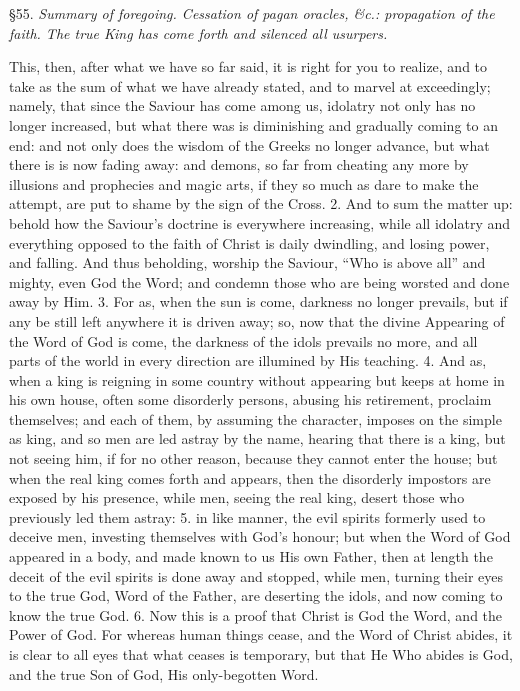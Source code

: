 
§55. \emph{Summary of foregoing. Cessation of pagan oracles, \&c.: propagation of the faith. The true King has come forth and silenced all usurpers.}

This, then, after what we have so far said, it is right for you to realize, and to take as the sum of what we have already stated, and to marvel at exceedingly; namely, that since the Saviour has come among us, idolatry not only has no longer increased, but what there was is diminishing and gradually coming to an end: and not only does the wisdom of the Greeks no longer advance, but what there is is now fading away: and demons, so far from cheating any more by illusions and prophecies and magic arts, if they so much as dare to make the attempt, are put to shame by the sign of the Cross. 2. And to sum the matter up: behold how the Saviour’s doctrine is everywhere increasing, while all idolatry and everything opposed to the faith of Christ is daily dwindling, and losing power, and falling. And thus beholding, worship the Saviour, “Who is above all” and mighty, even God the Word; and condemn those who are being worsted and done away by Him. 3. For as, when the sun is come, darkness no longer prevails, but if any be still left anywhere it is driven away; so, now that the divine Appearing of the Word of God is come, the darkness of the idols prevails no more, and all parts of the world in every direction are illumined by His teaching. 4. And as, when a king is reigning in some country without appearing but keeps at home in his own house, often some disorderly persons, abusing his retirement, proclaim themselves; and each of them, by assuming the character, imposes on the simple as king, and so men are led astray by the name, hearing that there is a king, but not seeing him, if for no other reason, because they cannot enter the house; but when the real king comes forth and appears, then the disorderly impostors are exposed by his presence, while men, seeing the real king, desert those who previously led them astray: 5. in like manner, the evil spirits formerly used to deceive men, investing themselves with God’s honour; but when the Word of God appeared in a body, and made known to us His own Father, then at length the deceit of the evil spirits is done away and stopped, while men, turning their eyes to the true God, Word of the Father, are deserting the idols, and now coming to know the true God. 6. Now this is a proof that Christ is God the Word, and the Power of God. For whereas human things cease, and the Word of Christ abides, it is clear to all eyes that what ceases is temporary, but that He Who abides is God, and the true Son of God, His only-begotten Word.

